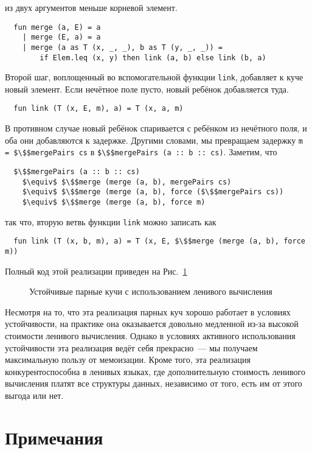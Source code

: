 из двух аргументов меньше корневой элемент.
\begin{lstlisting}
  fun merge (a, E) = a
    | merge (E, a) = a
    | merge (a as T (x, _, _), b as T (y, _, _)) =
        if Elem.leq (x, y) then link (a, b) else link (b, a)
\end{lstlisting}
Второй шаг, воплощенный во вспомогательной функции \lstinline!link!,
добавляет к куче новый элемент. Если нечётное поле пусто, новый
ребёнок добавляется туда.
\begin{lstlisting}
  fun link (T (x, E, m), a) = T (x, a, m)
\end{lstlisting}
В противном случае новый ребёнок спаривается с ребёнком из нечётного
поля, и оба они добавляются к задержке. Другими словами, мы превращаем
задержку \lstinline!m = $\$$mergePairs cs! в 
\lstinline!$\$$mergePairs (a :: b :: cs)!. Заметим, что
\begin{lstlisting}
  $\$$mergePairs (a :: b :: cs)
    $\equiv$ $\$$merge (merge (a, b), mergePairs cs)
    $\equiv$ $\$$merge (merge (a, b), force ($\$$mergePairs cs))
    $\equiv$ $\$$merge (merge (a, b), force m)
\end{lstlisting}
так что, вторую ветвь функции \lstinline!link! можно записать как
\begin{lstlisting}
  fun link (T (x, b, m), a) = T (x, E, $\$$merge (merge (a, b), force m))
\end{lstlisting}
Полный код этой реализации приведен на Рис.~\ref{fig:6.6}

\begin{figure}
  \centering
  
  \caption{Устойчивые парные кучи с использованием ленивого вычисления}
  \label{fig:6.6}
\end{figure}

\begin{hint}
  Несмотря на то, что эта реализация парных куч хорошо работает в условиях
  устойчивости, на практике она оказывается довольно
  медленной из-за высокой стоимости ленивого вычисления. Однако в
  условиях активного использования устойчивости эта реализация
  ведёт себя прекрасно~--- мы получаем максимальную пользу от
  мемоизации. Кроме того, эта реализация конкурентоспособна в ленивых
  языках, где дополнительную стоимость ленивого вычисления платят все
  структуры данных, независимо от того, есть им от этого выгода или нет.
\end{hint}

\section{Примечания}
\label{sc:6.6}

